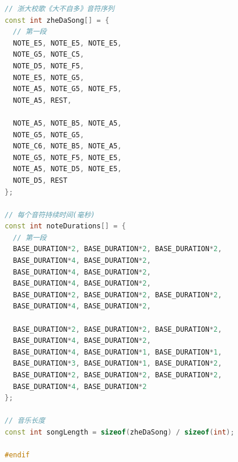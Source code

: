 \documentclass[10.5pt]{config}
\begin{document}
\begin{lstlisting}[language=C++, caption="ToneConfig.h"]
// 浙大校歌《大不自多》音符序列
const int zheDaSong[] = {
  // 第一段
  NOTE_E5, NOTE_E5, NOTE_E5, 
  NOTE_G5, NOTE_C5, 
  NOTE_D5, NOTE_F5, 
  NOTE_E5, NOTE_G5, 
  NOTE_A5, NOTE_G5, NOTE_F5, 
  NOTE_A5, REST,

  NOTE_A5, NOTE_B5, NOTE_A5, 
  NOTE_G5, NOTE_G5,
  NOTE_C6, NOTE_B5, NOTE_A5, 
  NOTE_G5, NOTE_F5, NOTE_E5, 
  NOTE_A5, NOTE_D5, NOTE_E5, 
  NOTE_D5, REST
};

// 每个音符持续时间(毫秒)
const int noteDurations[] = {
  // 第一段
  BASE_DURATION*2, BASE_DURATION*2, BASE_DURATION*2, 
  BASE_DURATION*4, BASE_DURATION*2, 
  BASE_DURATION*4, BASE_DURATION*2,
  BASE_DURATION*4, BASE_DURATION*2,
  BASE_DURATION*2, BASE_DURATION*2, BASE_DURATION*2,
  BASE_DURATION*4, BASE_DURATION*2,
  
  BASE_DURATION*2, BASE_DURATION*2, BASE_DURATION*2,
  BASE_DURATION*4, BASE_DURATION*2, 
  BASE_DURATION*4, BASE_DURATION*1, BASE_DURATION*1, 
  BASE_DURATION*3, BASE_DURATION*1, BASE_DURATION*2,
  BASE_DURATION*2, BASE_DURATION*2, BASE_DURATION*2,
  BASE_DURATION*4, BASE_DURATION*2
};

// 音乐长度
const int songLength = sizeof(zheDaSong) / sizeof(int);

#endif
\end{lstlisting}
\end{document}
